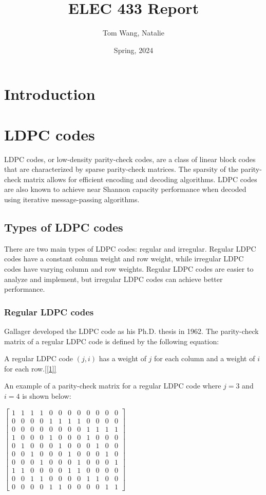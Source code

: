 \documentclass[letterpaper,12pt,oneside]{article}
\title{ELEC 433 Report}
\author{Tom Wang, Natalie}
\date{Spring, 2024}
\begin{document}
\maketitle
\section{Introduction}
\section{LDPC codes}
LDPC codes, or low-density parity-check codes, are a class of linear block codes that are characterized by sparse parity-check matrices. The sparsity of the parity-check matrix allows for efficient encoding and decoding algorithms. LDPC codes are also known to achieve near Shannon capacity performance when decoded using iterative message-passing algorithms.
\subsection{Types of LDPC codes}
There are two main types of LDPC codes: regular and irregular. Regular LDPC codes have a constant column weight and row weight, while irregular LDPC codes have varying column and row weights. Regular LDPC codes are easier to analyze and implement, but irregular LDPC codes can achieve better performance.

\subsubsection{Regular LDPC codes}
Gallager developed the LDPC code as his Ph.D. thesis in 1962. The parity-check matrix of a regular LDPC code is defined by the following equation:

A regular LDPC code $(j,i)$ has a weight of $j$ for each column and a weight of $i$ for each row.\ref{[1]} 

An example of a parity-check matrix for a regular LDPC code where $j=3$ and $i=4$ is shown below:

$\begin{bmatrix}
    1 & 1 & 1 & 1 & 0 & 0 & 0 & 0 & 0 & 0 & 0 & 0\\
    0 & 0 & 0 & 0 & 1 & 1 & 1 & 1 & 0 & 0 & 0 & 0\\
    0 & 0 & 0 & 0 & 0 & 0 & 0 & 0 & 1 & 1 & 1 & 1\\
    1 & 0 & 0 & 0 & 1 & 0 & 0 & 0 & 1 & 0 & 0 & 0\\
    0 & 1 & 0 & 0 & 0 & 1 & 0 & 0 & 0 & 1 & 0 & 0\\
    0 & 0 & 1 & 0 & 0 & 0 & 1 & 0 & 0 & 0 & 1 & 0\\
    0 & 0 & 0 & 1 & 0 & 0 & 0 & 1 & 0 & 0 & 0 & 1\\
    1 & 1 & 0 & 0 & 0 & 0 & 1 & 1 & 0 & 0 & 0 & 0\\
    0 & 0 & 1 & 1 & 0 & 0 & 0 & 0 & 1 & 1 & 0 & 0\\
    0 & 0 & 0 & 0 & 1 & 1 & 0 & 0 & 0 & 0 & 1 & 1
\end{bmatrix}$
\end{document}
